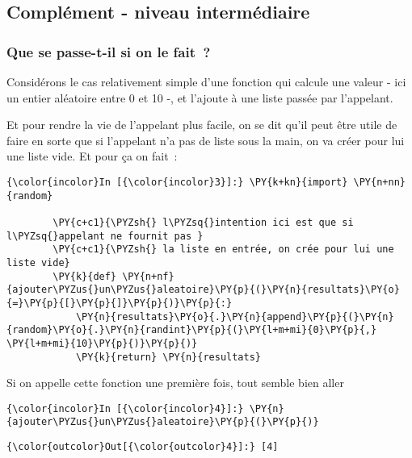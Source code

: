     \hypertarget{compluxe9ment---niveau-intermuxe9diaire}{%
\subsection{Complément - niveau
intermédiaire}\label{compluxe9ment---niveau-intermuxe9diaire}}

    \hypertarget{que-se-passe-t-il-si-on-le-fait}{%
\subsubsection{Que se passe-t-il si on le
fait~?}\label{que-se-passe-t-il-si-on-le-fait}}

    Considérons le cas relativement simple d'une fonction qui calcule une
valeur - ici un entier aléatoire entre 0 et 10 -, et l'ajoute à une
liste passée par l'appelant.

    Et pour rendre la vie de l'appelant plus facile, on se dit qu'il peut
être utile de faire en sorte que si l'appelant n'a pas de liste sous la
main, on va créer pour lui une liste vide. Et pour ça on fait~:

    \begin{Verbatim}[commandchars=\\\{\}]
{\color{incolor}In [{\color{incolor}3}]:} \PY{k+kn}{import} \PY{n+nn}{random}
        
        \PY{c+c1}{\PYZsh{} l\PYZsq{}intention ici est que si l\PYZsq{}appelant ne fournit pas }
        \PY{c+c1}{\PYZsh{} la liste en entrée, on crée pour lui une liste vide}
        \PY{k}{def} \PY{n+nf}{ajouter\PYZus{}un\PYZus{}aleatoire}\PY{p}{(}\PY{n}{resultats}\PY{o}{=}\PY{p}{[}\PY{p}{]}\PY{p}{)}\PY{p}{:}
            \PY{n}{resultats}\PY{o}{.}\PY{n}{append}\PY{p}{(}\PY{n}{random}\PY{o}{.}\PY{n}{randint}\PY{p}{(}\PY{l+m+mi}{0}\PY{p}{,} \PY{l+m+mi}{10}\PY{p}{)}\PY{p}{)}
            \PY{k}{return} \PY{n}{resultats}
\end{Verbatim}


    Si on appelle cette fonction une première fois, tout semble bien aller

    \begin{Verbatim}[commandchars=\\\{\}]
{\color{incolor}In [{\color{incolor}4}]:} \PY{n}{ajouter\PYZus{}un\PYZus{}aleatoire}\PY{p}{(}\PY{p}{)}
\end{Verbatim}


\begin{Verbatim}[commandchars=\\\{\}]
{\color{outcolor}Out[{\color{outcolor}4}]:} [4]
\end{Verbatim}
            
